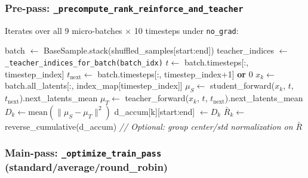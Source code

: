 \documentclass[11pt]{article}
\begin{document}
\subsubsection{Pre-pass: \texttt{\_precompute\_rank\_reinforce\_and\_teacher}}

Iterates over all 9 micro-batches $\times$ 10 timesteps under \texttt{no\_grad}:

\begin{algorithm}[H]
\caption{OPD Pre-pass (standard/average/round\_robin)}
\begin{algorithmic}
    \STATE batch $\leftarrow$ BaseSample.stack(shuffled\_samples[start:end]) 
    \STATE teacher\_indices $\leftarrow$ \texttt{\_teacher\_indices\_for\_batch(batch\_idx)}
        \STATE $t \leftarrow$ batch.timesteps[:, timestep\_index]
        \STATE $t_\text{next} \leftarrow$ batch.timesteps[:, timestep\_index+1] \textbf{or} 0
        \STATE $x_k \leftarrow$ batch.all\_latents[:, index\_map[timestep\_index]]
        \STATE $\mu_S \leftarrow$ student\_forward($x_k$, $t$, $t_\text{next}$).next\_latents\_mean
        \STATE $\mu_T \leftarrow$ teacher\_forward($x_k$, $t$, $t_\text{next}$).next\_latents\_mean 
        \STATE $D_k \leftarrow \text{mean}(\|\mu_S - \mu_T\|^2)$ 
        \STATE d\_accum[k][start:end] $\leftarrow D_k$
    \ENDFOR
\ENDFOR
\STATE $\bar{R}_k \leftarrow$ reverse\_cumulative(d\_accum) 
\STATE \textit{// Optional: group center/std normalization on $\bar{R}$}
\end{algorithmic}
\end{algorithm}

\subsubsection{Main-pass: \texttt{\_optimize\_train\_pass} (standard/average/round\_robin)}
\end{document}
